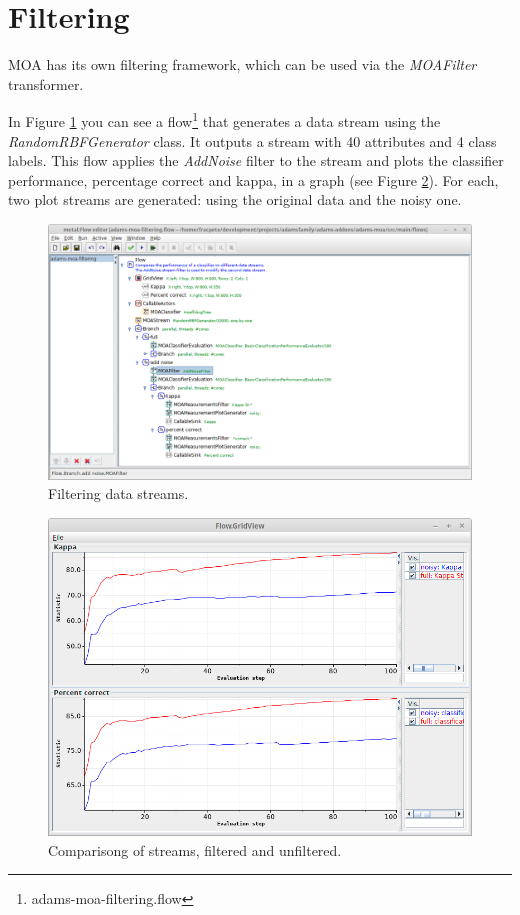 \documentclass[a4paper]{book}
\begin{document}
\clearpage
\newpage
\section{Filtering}
MOA has its own filtering framework, which can be used via the \textit{MOAFilter}
transformer.

In Figure \ref{moa-stream-filtering_flow} you can see a flow\footnote{adams-moa-filtering.flow} 
that generates a data stream using the \textit{RandomRBFGenerator} class. It
outputs a stream with 40 attributes and 4 class labels. This flow applies
the \textit{AddNoise} filter to the stream
and plots the classifier performance, percentage correct and kappa, in a graph
(see Figure \ref{moa-stream-filtering_output}). For each, two plot streams are
generated: using the original data and the noisy one.

\begin{figure}[htb]
  \centering
  \includegraphics[width=12.0cm]{images/moa-stream-filtering_flow.png}
  \caption{Filtering data streams.}
  \label{moa-stream-filtering_flow}
\end{figure}

\begin{figure}[htb]
  \centering
  \includegraphics[width=12.0cm]{images/moa-stream-filtering_output.png}
  \caption{Comparisong of streams, filtered and unfiltered.}
  \label{moa-stream-filtering_output}
\end{figure}
\end{document}
